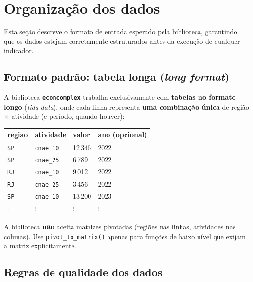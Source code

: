 \documentclass[12pt, a4paper]{article}
\newcommand{\pkg}[1]{\texttt{\textbf{#1}}}
\newcommand{\fn}[1]{\texttt{#1}}
\begin{document}
\section{Organiza\c{c}\~{a}o dos dados}

Esta se\c{c}\~{a}o descreve o formato de entrada esperado pela biblioteca,
garantindo que os dados estejam corretamente estruturados antes da
execu\c{c}\~{a}o de qualquer indicador.

\subsection{Formato padr\~{a}o: tabela longa (\textit{long format})}

A biblioteca \pkg{econcomplex} trabalha exclusivamente com
\textbf{tabelas no formato longo} (\textit{tidy data}),
onde cada linha representa \textbf{uma combina\c{c}\~{a}o \'{u}nica} de
regi\~{a}o $\times$ atividade (e per\'{i}odo, quando houver):

\begin{center}
\renewcommand{\arraystretch}{1.3}
\begin{tabular}{llll}
\toprule
\textbf{regiao} & \textbf{atividade} & \textbf{valor} & \textbf{ano (opcional)} \\
\midrule
\texttt{SP}  & \texttt{cnae\_10} & 12\,345 & 2022 \\
\texttt{SP}  & \texttt{cnae\_25} &  6\,789 & 2022 \\
\texttt{RJ}  & \texttt{cnae\_10} &  9\,012 & 2022 \\
\texttt{RJ}  & \texttt{cnae\_25} &  3\,456 & 2022 \\
\texttt{SP}  & \texttt{cnae\_10} & 13\,200 & 2023 \\
$\vdots$ & $\vdots$ & $\vdots$ & $\vdots$ \\
\bottomrule
\end{tabular}
\end{center}

\begin{warnbox}
  A biblioteca \textbf{n\~{a}o} aceita matrizes pivotadas (regi\~{o}es nas
  linhas, atividades nas colunas). Use \fn{pivot\_to\_matrix()} apenas para
  fun\c{c}\~{o}es de baixo n\'{i}vel que exijam a matriz explicitamente.
\end{warnbox}

\subsection{Regras de qualidade dos dados}
\end{document}
